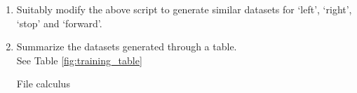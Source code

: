 \documentclass[journal,12pt,twocolumn]{IEEEtran}
\renewcommand\thesection{\arabic{section}}
\begin{document}
\begin{enumerate}[label=\thesection.\arabic*
,ref=\thesection.\theenumi]
\item Suitably modify the above script to generate similar datasets for `left', `right', `stop' and `forward'. 
%
\item Summarize the datasets generated through a table.
\\
\solution See Table \ref{fig:training_table}
\begin{table}
\begin{center}

\end{center}
\caption{File calculus}
\label{fig:training_table}
\end{table}
\end{enumerate}
%

%
%	


%

%
%
\end{document}
